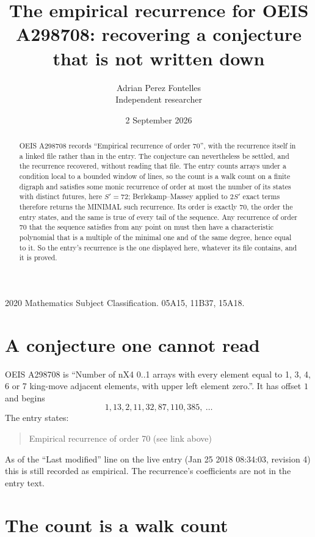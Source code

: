 \documentclass[11pt,a4paper]{article}
\title{The empirical recurrence for OEIS A298708: recovering a conjecture that is not written down}
\author{Adrian Perez Fontelles\\ \small Independent researcher}
\date{2 September 2026}
\theoremstyle{plain}
\theoremstyle{definition}
\begin{document}
\maketitle

\begin{abstract}
OEIS A298708 records ``Empirical recurrence of order $70$'', with the recurrence itself in a
linked file rather than in the entry. The conjecture can nevertheless be settled, and the
recurrence recovered, without reading that file. The entry counts arrays under a condition
local to a bounded window of lines, so the count is a walk count on a finite digraph and
satisfies some monic recurrence of order at most the number of its states with distinct
futures, here $S'=72$; Berlekamp--Massey applied to $2S'$ exact
terms therefore returns the MINIMAL such recurrence. Its order is exactly $70$, the order
the entry states, and the same is true of every tail of the sequence. Any recurrence of order
$70$ that the sequence satisfies from any point on must then have a characteristic
polynomial that is a multiple of the minimal one and of the same degree, hence equal to it. So
the entry's recurrence is the one displayed here, whatever its file contains, and it is
proved.
\end{abstract}

\noindent\small 2020 Mathematics Subject Classification. 05A15, 11B37, 15A18.\normalsize

\section{A conjecture one cannot read}

OEIS A298708 is ``Number of nX4 0..1 arrays with every element equal to 1, 3, 4, 6 or 7 king-move adjacent elements, with upper left element zero.''. It has offset $1$ and begins
\[
1, 13, 2, 11, 32, 87, 110, 385,\ \dots
\]
The entry states:
\begin{quote}
Empirical recurrence of order 70 (see link above)
\end{quote}
As of the ``Last modified'' line on the live entry (Jan 25 2018 08:34:03, revision 4) this is still
recorded as empirical. The recurrence's coefficients are not in the entry text.

\section{The count is a walk count}
\end{document}
